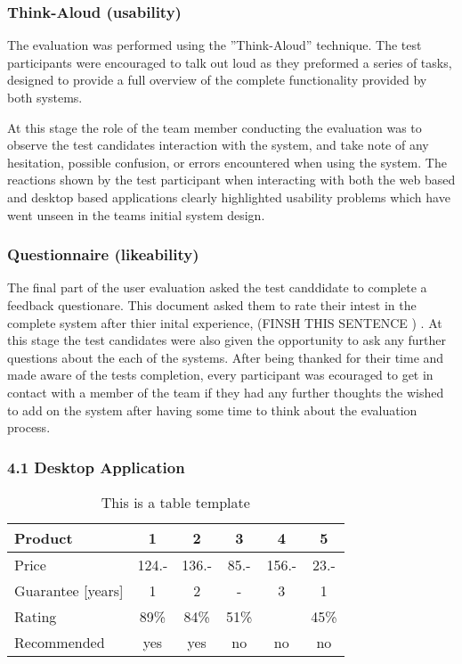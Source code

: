 \subsubsection{Think-Aloud (usability) }

The evaluation was performed using the ”Think-Aloud” technique. The test participants were encouraged to talk out loud as they preformed a series of tasks, designed to provide a full overview of the complete functionality provided by both systems. 

At this stage the role of the team member conducting the evaluation was to observe the test candidates interaction with the system, and take note of any hesitation, possible confusion, or errors encountered when using the system. The reactions shown by the test participant when interacting with both the web based and desktop based applications clearly highlighted usability problems which have went unseen in the teams initial system design. 


\subsubsection{Questionnaire (likeability)}

The final part of the user evaluation asked the test canddidate to complete a feedback questionare. This document asked them to rate their intest in the complete system after thier inital experience, (FINSH THIS SENTENCE )    . At this stage the test candidates were also given the opportunity to ask any further questions about the each of the systems. After being thanked for their time and made aware of the tests completion, every participant was ecouraged to get in contact with a member of the team if they had any further thoughts the wished to add on the system after having some time to think about the evaluation process.    

\subsubsection{4.1 Desktop Application}

\begin{table}[t]
\centering
\begin{tabular}{|l|c|c|c|c|c|}
\hline
Product & 1 & 2 & 3 & 4 & 5\\
\hline
Price & 124.- & 136.- & 85.- & 156.- & 23.-\\
Guarantee [years] & 1 & 2 & - & 3 & 1\\
Rating & 89\% & 84\% & 51\% & & 45\%\\
\hline
\hline
Recommended & yes & yes & no & no & no\\
\hline
\end{tabular}
\caption{This is a table template}
\label{tab:template}
\end{table}


